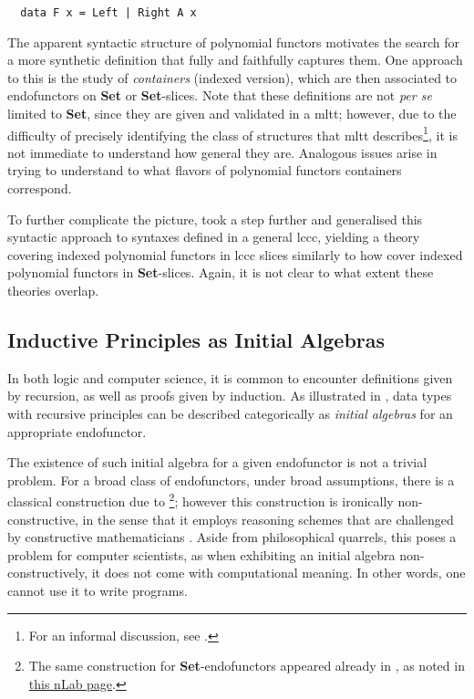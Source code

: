 \documentclass[a4paper]{article}
\newcommand{\catname}[1]{{\normalfont\textbf{#1}}}
\newcommand{\Set}{\catname{Set}}
\begin{document}
\begin{lstlisting}
  data F x = Left | Right A x 
\end{lstlisting}

The apparent syntactic structure of polynomial functors motivates the search for a more synthetic definition that fully and faithfully captures them. One approach to this is the study of \textit{containers} \cite{Abbott2003}\cite{Abbott2005}\cite{Altenkirch2015}(indexed version), which are then associated to endofunctors on \Set{} or \Set{}-slices. Note that these definitions are not \textit{per se} limited to \Set{}, since they are given and validated in a \gls{mltt}; however, due to the difficulty of precisely identifying the class of structures that \gls{mltt} describes\footnote{For an informal discussion, see \cite{Voevodsky2015}.}, it is not immediate to understand how general they are. Analogous issues arise in trying to understand to what flavors of polynomial functors containers correspond.

To further complicate the picture, \textcite{Gambino2009} took a step further and generalised this syntactic approach to syntaxes defined in a general \gls{lccc}, yielding a theory covering indexed polynomial functors in \gls{lccc} slices similarly to how \cite{Altenkirch2015} cover indexed polynomial functors in \Set{}-slices. Again, it is not clear to what extent these theories overlap.

\subsection{Inductive Principles as Initial Algebras}

In both logic and computer science, it is common to encounter definitions given by recursion, as well as proofs given by induction. As illustrated in \cite[Section 10.5]{Awodey2010}, data types with recursive principles can be described categorically as \textit{initial algebras} for an appropriate endofunctor.

The existence of such initial algebra for a given endofunctor is not a trivial problem. For a broad class of endofunctors, under broad assumptions, there is a classical construction due to \textcite{Adamek1974}\footnote{The same construction for \Set{}-endofunctors appeared already in \textcite{Pohlova1973}, as noted in \href{https://ncatlab.org/nlab/show/Ad\%C3\%A1mek\%27s+fixed+point+theorem}{this nLab page}.}; however this construction is ironically non-constructive, in the sense that it employs reasoning schemes that are challenged by constructive mathematicians \cite[Theorem 1.1, discussion]{Pitts2021}. Aside from philosophical quarrels, this poses a problem for computer scientists, as when exhibiting an initial algebra non-constructively, it does not come with computational meaning. In other words, one cannot use it to write programs.
\end{document}
